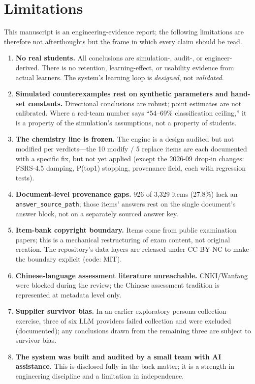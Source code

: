 \section{Limitations}
\label{sec:limitations}

This manuscript is an engineering-evidence report; the following limitations are therefore not afterthoughts but the frame in which every claim should be read.

\begin{enumerate}\setlength{\itemsep}{0pt}\setlength{\parskip}{0pt}\setlength{\parsep}{0pt}
\item \textbf{No real students.} All conclusions are simulation-, audit-, or engineer-derived. There is no retention, learning-effect, or usability evidence from actual learners. The system's learning loop is \emph{designed}, not \emph{validated}.
\item \textbf{Simulated counterexamples rest on synthetic parameters and hand-set constants.} Directional conclusions are robust; point estimates are not calibrated. Where a red-team number says ``54--69\% classification ceiling,'' it is a property of the simulation's assumptions, not a property of students.
\item \textbf{The chemistry line is frozen.} The engine is a design audited but not modified per verdicts---the 10 modify / 5 replace items are each documented with a specific fix, but not yet applied (except the 2026-09 drop-in changes: FSRS-4.5 damping, P(top1) stopping, provenance field, each with regression tests).
\item \textbf{Document-level provenance gaps.} 926 of 3,329 items (27.8\%) lack an \texttt{answer\_source\_path}; those items' answers rest on the single document's answer block, not on a separately sourced answer key.
\item \textbf{Item-bank copyright boundary.} Items come from public examination papers; this is a mechanical restructuring of exam content, not original creation. The repository's data layers are released under CC BY-NC to make the boundary explicit (code: MIT).
\item \textbf{Chinese-language assessment literature unreachable.} CNKI/Wanfang were blocked during the review; the Chinese assessment tradition is represented at metadata level only.
\item \textbf{Supplier survivor bias.} In an earlier exploratory persona-collection exercise, three of six LLM providers failed collection and were excluded (documented); any conclusions drawn from the remaining three are subject to survivor bias.
\item \textbf{The system was built and audited by a small team with AI assistance.} This is disclosed fully in the back matter; it is a strength in engineering discipline and a limitation in independence.
\end{enumerate}

